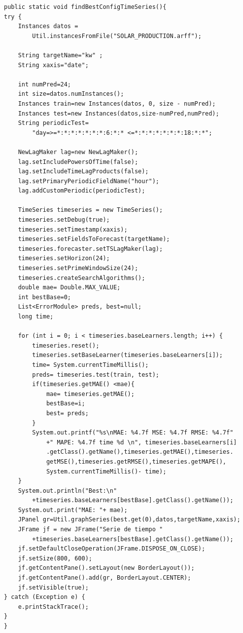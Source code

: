 \begin{lstlisting}[frame=single]  
public static void findBestConfigTimeSeries(){
try { 
	Instances datos =
		Util.instancesFromFile("SOLAR_PRODUCTION.arff");

	String targetName="kw" ;
	String xaxis="date";
	
	int numPred=24;
	int size=datos.numInstances();
	Instances train=new Instances(datos, 0, size - numPred);
	Instances test=new Instances(datos,size-numPred,numPred);
	String periodicTest=
		"day=>=*:*:*:*:*:*:*:6:*:* <=*:*:*:*:*:*:*:18:*:*";
	
	NewLagMaker lag=new NewLagMaker();
	lag.setIncludePowersOfTime(false);
	lag.setIncludeTimeLagProducts(false);
	lag.setPrimaryPeriodicFieldName("hour"); 
	lag.addCustomPeriodic(periodicTest);
	
	TimeSeries timeseries = new TimeSeries();
	timeseries.setDebug(true);
	timeseries.setTimestamp(xaxis);
	timeseries.setFieldsToForecast(targetName);
	timeseries.forecaster.setTSLagMaker(lag);
	timeseries.setHorizon(24);
	timeseries.setPrimeWindowSize(24);
	timeseries.createSearchAlgorithms();
	double mae= Double.MAX_VALUE;
	int bestBase=0;
	List<ErrorModule> preds, best=null;
	long time;

	for (int i = 0; i < timeseries.baseLearners.length; i++) {
		timeseries.reset();
		timeseries.setBaseLearner(timeseries.baseLearners[i]);
		time= System.currentTimeMillis();
		preds= timeseries.test(train, test);
		if(timeseries.getMAE() <mae){
			mae= timeseries.getMAE();
			bestBase=i;
			best= preds;
		}
		System.out.printf("%s\nMAE: %4.7f MSE: %4.7f RMSE: %4.7f"
			+" MAPE: %4.7f time %d \n", timeseries.baseLearners[i]
			.getClass().getName(),timeseries.getMAE(),timeseries.
			getMSE(),timeseries.getRMSE(),timeseries.getMAPE(),
			System.currentTimeMillis()- time);
	}
	System.out.println("Best:\n"
		+timeseries.baseLearners[bestBase].getClass().getName());
	System.out.print("MAE: "+ mae);
	JPanel gr=Util.graphSeries(best.get(0),datos,targetName,xaxis);
	JFrame jf = new JFrame("Serie de tiempo " 
		+timeseries.baseLearners[bestBase].getClass().getName());
	jf.setDefaultCloseOperation(JFrame.DISPOSE_ON_CLOSE);
	jf.setSize(800, 600);
	jf.getContentPane().setLayout(new BorderLayout());
	jf.getContentPane().add(gr, BorderLayout.CENTER);
	jf.setVisible(true);
} catch (Exception e) {
	e.printStackTrace();
}
}
\end{lstlisting}

